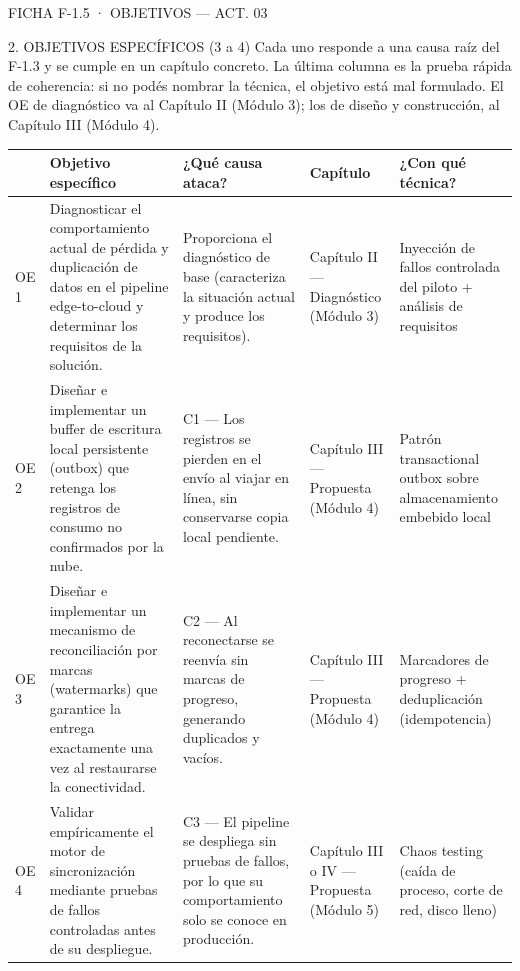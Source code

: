 \documentclass[11pt,a4paper]{article}
\newcommand{\tblhead}{\rowcolor{gris800}}
\begin{document}
\begin{seccion}{\faBullseye}{FICHA F-1.5 · OBJETIVOS --- ACT. 03}
\begin{seccion}{\faListOl}{2. OBJETIVOS ESPECÍFICOS (3 a 4)}
{\small
Cada uno responde a una causa raíz del F-1.3 y se cumple en un capítulo concreto. La última columna es la prueba rápida de coherencia: si no podés nombrar la técnica, el objetivo está mal formulado. El OE de diagnóstico va al Capítulo II (Módulo 3); los de diseño y construcción, al Capítulo III (Módulo 4).
}
\vspace{4pt}
\renewcommand{\arraystretch}{1.3}
\begin{tabularx}{\linewidth}{>{\centering\arraybackslash}p{1.0cm} X >{\raggedright\arraybackslash}p{2.9cm} p{2.4cm} >{\raggedright\arraybackslash}p{2.6cm}}
  \toprule
  \tblhead {\color{white}\bfseries N.º} & {\color{white}\bfseries Objetivo específico} & {\color{white}\bfseries ¿Qué causa ataca?} & {\color{white}\bfseries Capítulo} & {\color{white}\bfseries ¿Con qué técnica?} \\
  \midrule
  OE 1 & Diagnosticar el comportamiento actual de pérdida y duplicación de datos en el pipeline edge-to-cloud y determinar los requisitos de la solución. & Proporciona el diagnóstico de base (caracteriza la situación actual y produce los requisitos). & Capítulo II --- Diagnóstico (Módulo 3) & Inyección de fallos controlada del piloto + análisis de requisitos \\
  OE 2 & Diseñar e implementar un buffer de escritura local persistente (outbox) que retenga los registros de consumo no confirmados por la nube. & C1 --- Los registros se pierden en el envío al viajar en línea, sin conservarse copia local pendiente. & Capítulo III --- Propuesta (Módulo 4) & Patrón transactional outbox sobre almacenamiento embebido local \\
  OE 3 & Diseñar e implementar un mecanismo de reconciliación por marcas (watermarks) que garantice la entrega exactamente una vez al restaurarse la conectividad. & C2 --- Al reconectarse se reenvía sin marcas de progreso, generando duplicados y vacíos. & Capítulo III --- Propuesta (Módulo 4) & Marcadores de progreso + deduplicación (idempotencia) \\
  OE 4 & Validar empíricamente el motor de sincronización mediante pruebas de fallos controladas antes de su despliegue. & C3 --- El pipeline se despliega sin pruebas de fallos, por lo que su comportamiento solo se conoce en producción. & Capítulo III o IV --- Propuesta (Módulo 5) & Chaos testing (caída de proceso, corte de red, disco lleno) \\
  \bottomrule
\end{tabularx}
\end{seccion}


\end{seccion}
\end{document}
